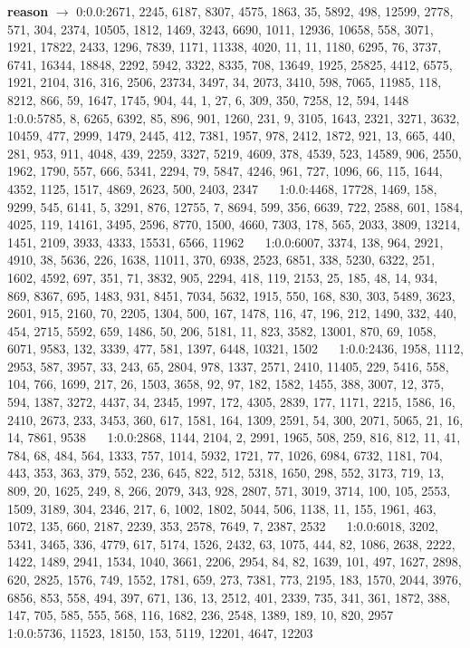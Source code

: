 \documentclass[a4paper,11pt,oneside]{book}
\begin{document}
\textbf{reason}  $\rightarrow$	0:0.0:2671, 2245, 6187, 8307, 4575, 1863, 35, 5892, 498, 12599, 2778, 571, 304, 2374, 10505, 1812, 1469, 3243, 6690, 1011, 12936, 10658, 558, 3071, 1921, 17822, 2433, 1296, 7839, 1171, 11338, 4020, 11, 11, 1180, 6295, 76, 3737, 6741, 16344, 18848, 2292, 5942, 3322, 8335, 708, 13649, 1925, 25825, 4412, 6575, 1921, 2104, 316, 316, 2506, 23734, 3497, 34, 2073, 3410, 598, 7065, 11985, 118, 8212, 866, 59, 1647, 1745, 904, 44, 1, 27, 6, 309, 350, 7258, 12, 594, 1448	$\quad$	1:0.0:5785, 8, 6265, 6392, 85, 896, 901, 1260, 231, 9, 3105, 1643, 2321, 3271, 3632, 10459, 477, 2999, 1479, 2445, 412, 7381, 1957, 978, 2412, 1872, 921, 13, 665, 440, 281, 953, 911, 4048, 439, 2259, 3327, 5219, 4609, 378, 4539, 523, 14589, 906, 2550, 1962, 1790, 557, 666, 5341, 2294, 79, 5847, 4246, 961, 727, 1096, 66, 115, 1644, 4352, 1125, 1517, 4869, 2623, 500, 2403, 2347	$\quad$	1:0.0:4468, 17728, 1469, 158, 9299, 545, 6141, 5, 3291, 876, 12755, 7, 8694, 599, 356, 6639, 722, 2588, 601, 1584, 4025, 119, 14161, 3495, 2596, 8770, 1500, 4660, 7303, 178, 565, 2033, 3809, 13214, 1451, 2109, 3933, 4333, 15531, 6566, 11962	$\quad$	1:0.0:6007, 3374, 138, 964, 2921, 4910, 38, 5636, 226, 1638, 11011, 370, 6938, 2523, 6851, 338, 5230, 6322, 251, 1602, 4592, 697, 351, 71, 3832, 905, 2294, 418, 119, 2153, 25, 185, 48, 14, 934, 869, 8367, 695, 1483, 931, 8451, 7034, 5632, 1915, 550, 168, 830, 303, 5489, 3623, 2601, 915, 2160, 70, 2205, 1304, 500, 167, 1478, 116, 47, 196, 212, 1490, 332, 440, 454, 2715, 5592, 659, 1486, 50, 206, 5181, 11, 823, 3582, 13001, 870, 69, 1058, 6071, 9583, 132, 3339, 477, 581, 1397, 6448, 10321, 1502	$\quad$	1:0.0:2436, 1958, 1112, 2953, 587, 3957, 33, 243, 65, 2804, 978, 1337, 2571, 2410, 11405, 229, 5416, 558, 104, 766, 1699, 217, 26, 1503, 3658, 92, 97, 182, 1582, 1455, 388, 3007, 12, 375, 594, 1387, 3272, 4437, 34, 2345, 1997, 172, 4305, 2839, 177, 1171, 2215, 1586, 16, 2410, 2673, 233, 3453, 360, 617, 1581, 164, 1309, 2591, 54, 300, 2071, 5065, 21, 16, 14, 7861, 9538	$\quad$	1:0.0:2868, 1144, 2104, 2, 2991, 1965, 508, 259, 816, 812, 11, 41, 784, 68, 484, 564, 1333, 757, 1014, 5932, 1721, 77, 1026, 6984, 6732, 1181, 704, 443, 353, 363, 379, 552, 236, 645, 822, 512, 5318, 1650, 298, 552, 3173, 719, 13, 809, 20, 1625, 249, 8, 266, 2079, 343, 928, 2807, 571, 3019, 3714, 100, 105, 2553, 1509, 3189, 304, 2346, 217, 6, 1002, 1802, 5044, 506, 1138, 11, 155, 1961, 463, 1072, 135, 660, 2187, 2239, 353, 2578, 7649, 7, 2387, 2532	$\quad$	1:0.0:6018, 3202, 5341, 3465, 336, 4779, 617, 5174, 1526, 2432, 63, 1075, 444, 82, 1086, 2638, 2222, 1422, 1489, 2941, 1534, 1040, 3661, 2206, 2954, 84, 82, 1639, 101, 497, 1627, 2898, 620, 2825, 1576, 749, 1552, 1781, 659, 273, 7381, 773, 2195, 183, 1570, 2044, 3976, 6856, 853, 558, 494, 397, 671, 136, 13, 2512, 401, 2339, 735, 341, 361, 1872, 388, 147, 705, 585, 555, 568, 116, 1682, 236, 2548, 1389, 189, 10, 820, 2957	$\quad$	1:0.0:5736, 11523, 18150, 153, 5119, 12201, 4647, 12203	$\quad$	
\end{document}
